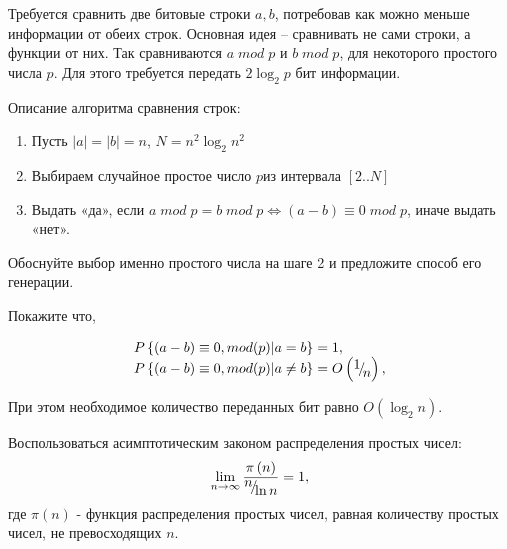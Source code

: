 \begin{problem}

Требуется сравнить две битовые строки $a,b$, потребовав как можно меньше информации от обеих строк. Основная идея -- сравнивать не сами строки, а функции от них. Так сравниваются $a\; mod\; p$ и $b\; mod\; p$, для некоторого простого числа $p$. Для этого требуется передать $2\log _{2} p$ бит информации.

Описание алгоритма сравнения строк:

\begin{enumerate}
\item  Пусть $\left|a\right|=\left|b\right|=n$, $N=n^{2} \log _{2} n^{2} $

\item  Выбираем случайное простое число $p$из интервала $\left[2..N\right]$ 

\item  Выдать «да», если $a\; mod\; p=b\; mod\; p\Leftrightarrow (a-b)\equiv 0\; mod\; p$, иначе выдать «нет».
\end{enumerate}

\noindent  Обоснуйте выбор именно простого числа на шаге 2 и предложите способ его генерации.  

\noindent Покажите что,

\[\begin{array}{l} {P\left\{(a-b)\equiv 0,mod(p)|a=b\right\}=1,} \\ {P\left\{(a-b)\equiv 0,mod(p)|a\ne b\right\}=O\left({\raise0.7ex\hbox{$ 1 $}\!\mathord{\left/ {\vphantom {1 n}} \right. \kern-\nulldelimiterspace}\!\lower0.7ex\hbox{$ n $}} \right),} \end{array}\] 
 
При этом необходимое количество переданных бит равно $O\left(\log _{2} n\right)$.

\begin{ordre}

Воспользоваться асимптотическим законом распределения простых чисел:
\[\mathop{\lim }\limits_{n\to \infty } \frac{\pi \left(n\right)}{{\raise0.7ex\hbox{$ n $}\!\mathord{\left/ {\vphantom {n \ln n}} \right. \kern-\nulldelimiterspace}\!\lower0.7ex\hbox{$ \ln n $}} } =1,\] 
где $\pi \left(n\right)$ - функция распределения простых чисел, равная количеству простых чисел, не превосходящих $n$.

\end{ordre}

\end{problem}

